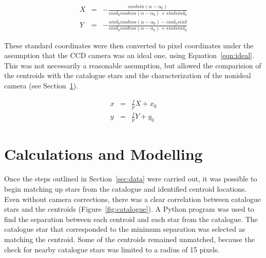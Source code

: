 \documentclass[a4paper,12pt]{article}
\begin{document}
\begin{equation}
\begin{array}{ccl}
X &=& -\frac{cos\delta sin(\alpha-\alpha_{0})}{cos\delta_{0}cos\delta cos(\alpha-\alpha_{0})+sin\delta sin\delta_{0}}\\
Y &=& -\frac{sin\delta_{0}cos\delta cos(\alpha-\alpha_{0})-cos\delta_{0}sin\delta}{cos\delta_{0}cos\delta cos(\alpha-\alpha_{0})+sin\delta sin\delta_{0}}
\end{array}
\label{eqn:standard}
\end{equation}

These standard coordinates were then converted to pixel coordinates under the assumption that the CCD camera was an ideal one, using Equation~\ref{eqn:ideal}. This was not necessarily a reasonable assumption, but allowed the comparision of the centroids with the catalogue stars and the characterization of the nonideal camera (see Section~\ref{sec:calc}).

\begin{equation}
\begin{array}{ccl}
x &=& \frac{f}{p}X+x_{0}\\
y &=& \frac{f}{p}Y+y_{0}
\end{array}
\label{eqn:ideal}
\end{equation}


\section{Calculations and Modelling}
\label{sec:calc}

Once the steps outlined in Section~\ref{sec:data} were carried out, it was possible to begin matching up stars from the catalogue and identified centroid locations. Even without camera corrections, there was a clear correlation between catalogue stars and the centroids (Figure~\ref{fig:catalogue}). A Python program was used to find the separation between each centroid and each star from the catalogue. The catalogue star that corresponded to the minimum separation was selected as matching the centroid. Some of the centroids remained unmatched, because the check for nearby catalogue stars was limited to a radius of 15 pixels.
\end{document}
